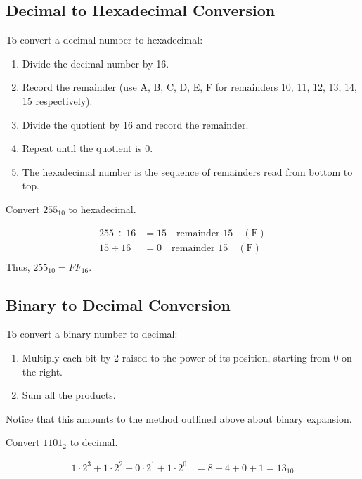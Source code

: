 \subsection*{Decimal to Hexadecimal Conversion}
To convert a decimal number to hexadecimal:
\begin{enumerate}
    \item Divide the decimal number by 16.
    \item Record the remainder (use A, B, C, D, E, F for remainders 10, 11, 12, 13, 14, 15 respectively).
    \item Divide the quotient by 16 and record the remainder.
    \item Repeat until the quotient is 0.
    \item The hexadecimal number is the sequence of remainders read from bottom to top.
\end{enumerate}

\begin{example}Convert \(255_{10}\) to hexadecimal.

\begin{solution}
    
\[
\begin{aligned}
255 \div 16 & = 15 \quad \text{remainder } 15 \quad (\text{F}) \\
15 \div 16 & = 0 \quad \text{remainder } 15 \quad (\text{F}) \\
\end{aligned}
\]
Thus, \(255_{10} = FF_{16}\).\end{solution}

\end{example}


\subsection*{Binary to Decimal Conversion}
To convert a binary number to decimal:
\begin{enumerate}
    \item Multiply each bit by 2 raised to the power of its position, starting from 0 on the right.
    \item Sum all the products.
\end{enumerate}

Notice that this amounts to the method outlined above about binary expansion.

\begin{example} Convert \(1101_2\) to decimal.

\begin{solution}
    

\[
\begin{aligned}
1 \cdot 2^3 + 1 \cdot 2^2 + 0 \cdot 2^1 + 1 \cdot 2^0 & = 8 + 4 + 0 + 1 = 13_{10}
\end{aligned}
\] \end{solution}

\end{example}

